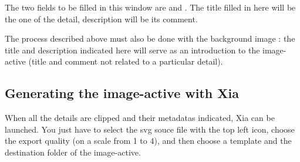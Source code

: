 The two fields to be filled in this window are  and 
.  The title filled in here will be the one of the detail, 
description will be its comment.

The process described above must also be done with the background image : 
the title and description indicated here will serve as an introduction to 
the image-active (title and comment not related to a particular detail).

\subsection{Generating the image-active with Xia}

When all the details are clipped and their metadatas indicated, Xia can be launched.
You just have to select the svg souce file with the top left icon,
choose the export quality (on a scale from 1 to 4), and then choose a 
template and the destination folder of the image-active.

